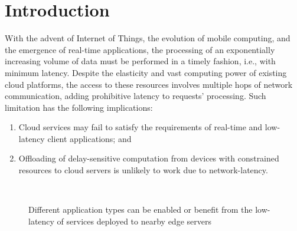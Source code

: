 \section{Introduction}

With the advent of Internet of Things, the evolution of mobile computing, and the emergence of real-time applications, the processing of an exponentially increasing volume of data must be performed in a timely fashion, i.e., with minimum latency. Despite the elasticity and vast computing power of existing cloud platforms, the access to these resources involves multiple hops of network communication, adding prohibitive latency to requests' processing. Such limitation has the following implications:

\begin{enumerate}

\item Cloud services may fail to satisfy the requirements of real-time and low-latency client applications; and

\item Offloading of delay-sensitive computation from devices with constrained resources to cloud servers is unlikely to work due to network-latency.

\end{enumerate}

\begin{figure}[htbp]
	\centering
	\hfill
	~
	\hfill
	\caption{Different application types can be enabled or benefit from the low-latency of services deployed to nearby edge servers} \label{fig:motivational-cases}
\end{figure}

